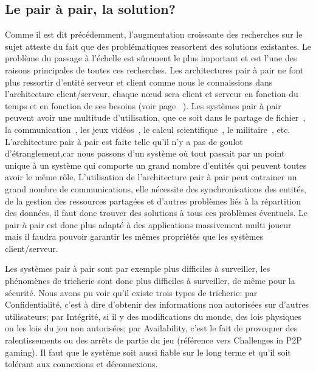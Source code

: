 	\subsection{Le pair à pair, la solution?}
	\par	%
	Comme il est dit précédemment, l'augmentation croissante des recherches sur le sujet atteste du fait que des problématiques ressortent des solutions existantes. Le problème du passage à l'échelle est sûrement le plus important et est l'une des raisons principales de toutes ces recherches. Les architectures pair à pair ne font plus ressortir d'entité serveur et client comme nous le connaissions dans l'architecture client/serveur, chaque nœud sera client et serveur en fonction du temps et en fonction de ses besoins (voir page ~\pageref{P2P/ClServ}). Les systèmes pair à pair peuvent avoir une multitude d'utilisation, que ce soit dans le partage de fichier~\cite{gnutella,napster,kazaa}, la communication~\cite{skype}, les jeux vidéos~\cite{starwars}, le calcul scientifique~\cite{Pastry,xtremweb,chord}, le militaire~\cite{jxta}, etc. \\
	L'architecture pair à pair est faite telle qu'il n'y a pas de goulot d'étranglement,car nous passons d'un système où tout passait par un point unique à un système qui comporte un grand nombre d'entités qui peuvent toutes avoir le même rôle. L'utilisation de l'architecture pair à pair peut entrainer un grand nombre de communications, elle nécessite des synchronisations des entités, de la gestion des ressources partagées et d'autres problèmes liés à la répartition des données, il faut donc trouver des solutions à tous ces problèmes éventuels. Le pair à pair est donc plus adapté à des applications massivement multi joueur mais il faudra pouvoir garantir les mêmes propriétés que les systèmes client/serveur. \\
	\par Les systèmes pair à pair sont par exemple plus difficiles à surveiller, les phénomènes de tricherie sont donc plus difficiles à surveiller, de même pour la sécurité. Nous avons pu voir qu'il existe trois types de tricherie: par Confidentialité, c'est à dire d'obtenir des informations non autorisées sur d'autres utilisateurs; par Intégrité, si il y des modifications du monde, des lois physiques ou les lois du jeu non autorisées; par Availability, c'est le fait de provoquer des ralentissements ou des arrêts de partie du jeu (référence vers Challenges in P2P gaming). Il faut que le système soit aussi fiable sur le long terme et qu'il soit tolérant aux connexions et déconnexions.\\
